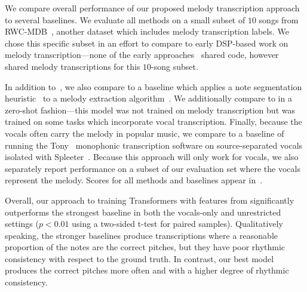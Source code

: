 We compare overall performance of our proposed melody transcription approach to several baselines. 
We evaluate all methods on a small subset of $10$ songs from RWC-MDB~\cite{goto2002rwc,goto2003rwc,goto2004development}, 
another dataset which includes melody transcription labels. 
We chose this specific subset in an effort to compare to early DSP-based work on melody transcription---none of the early approaches~\cite{paiva2004auditory,paiva2005detection,ryynanen2008automatic,weil2009automatic} shared code, however~\cite{ryynanen2008automatic} shared melody transcriptions for this $10$-song subset.

In addition to~\cite{ryynanen2008automatic}, we also compare to a baseline which applies a note segmentation heuristic~\cite{salamon2015midi} to a melody extraction algorithm~\cite{salamon2014melody}. 
We additionally compare to \mtthree{} in a zero-shot fashion---this model was not trained on melody transcription but was trained on some tasks which incorporate vocal transcription. 
Finally, because the vocals often carry the melody in popular music, we compare to a baseline of running the Tony~\cite{mauch2015computer} monophonic transcription software on source-separated vocals isolated with Spleeter~\cite{hennequin2020spleeter}. 
Because this approach will only work for vocals, we also separately report performance on a subset of our evaluation set where the vocals represent the melody. 
Scores for all methods and baselines appear in~. 

Overall, our approach to training Transformers with features from \jukebox{} significantly outperforms the strongest baseline in both the vocals-only and unrestricted settings (${p < 0.01}$ using a two-sided t-test for paired samples). 
Qualitatively speaking, the stronger baselines produce transcriptions where a reasonable proportion of the notes are the correct pitches, but they have poor rhythmic consistency with respect to the ground truth. 
In contrast, our best model produces the correct pitches more often and with a higher degree of rhythmic consistency.
